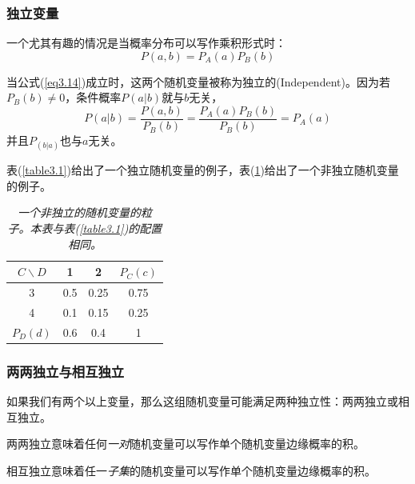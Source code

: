 \documentclass[UTF8]{ctexart}
\numberwithin{equation}{section}%
\numberwithin{figure}{section}%
\begin{document}
    \subsubsection{独立变量}
    一个尤其有趣的情况是当概率分布可以写作乘积形式时：
    \begin{equation}\label{eq3.14}
        P(a,b)=P_A(a)P_B(b)
    \end{equation}

    当公式(\ref{eq3.14})成立时，这两个随机变量被称为独立的(Independent)。因为若$P_B(b)\neq 0$，条件概率$P(a|b)$就与$b$无关，
    \begin{equation}
        P(a|b)=\frac{P(a,b)}{P_B(b)}=\frac{P_A(a)P_B(b)}{P_B(b)}=P_A(a)
    \end{equation}
    并且$P_(b|a)$也与$a$无关。
    
    表(\ref{table3.1})给出了一个独立随机变量的例子，表(\ref{table3.2})给出了一个非独立随机变量的例子。
    \begin{table}[H]
        \centering
        \caption{\textit{一个非独立的随机变量的粒子。本表与表(\ref{table3.1})的配置相同。}}
        \label{table3.2}
        {%
        \begin{tabular}{c|c|c|c}
        \hline
        \multicolumn{1}{c|}{$C\backslash D$} & \multicolumn{1}{c|}{1}   & \multicolumn{1}{c|}{2}   & \multicolumn{1}{c}{$P_C(c)$} \\ \hline
        \multicolumn{1}{c|}{3}   & \multicolumn{1}{c|}{0.5} & \multicolumn{1}{c|}{0.25} & \multicolumn{1}{c}{0.75}    \\ \hline
        4                        & 0.1                      & 0.15                     & 0.25                        \\ \hline
        $P_D(d)$                   & 0.6                      & 0.4                      & 1                          \\ \hline
        \end{tabular}
        }
        \end{table}

    \subsubsection{两两独立与相互独立}
    如果我们有两个以上变量，那么这组随机变量可能满足两种独立性：两两独立或相互独立。

    两两独立意味着任何\textit{一对}随机变量可以写作单个随机变量边缘概率的积。

    相互独立意味着任一\textit{子集}的随机变量可以写作单个随机变量边缘概率的积。
    
\end{document}
